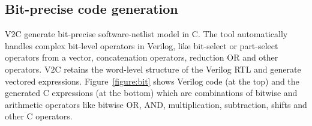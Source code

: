 \subsection{Bit-precise code generation}
V2C generate bit-precise software-netlist model in C.
The tool automatically handles complex bit-level operators in Verilog, 
like bit-select or part-select operators from a vector,
concatenation operators, reduction OR and other operators. V2C retains 
the word-level structure of the Verilog RTL and generate 
vectored expressions. Figure~\ref{figure:bit} shows 
Verilog code (at the top) and the generated C expressions 
(at the bottom) which are combinations of bitwise and 
arithmetic operators like bitwise OR, AND, multiplication, 
subtraction, shifts and other C operators.     
%
%
